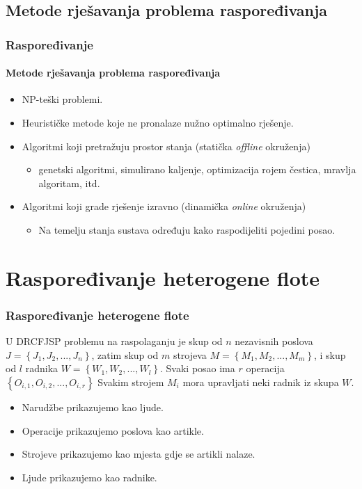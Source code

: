 \documentclass{beamer}
\begin{document}
\subsection{Metode rješavanja problema raspoređivanja}
\begin{frame}
\frametitle{Raspoređivanje}
\framesubtitle{Metode rješavanja problema raspoređivanja}
\begin{itemize}
    \item NP-teški problemi.
    \item Heurističke metode koje ne pronalaze nužno optimalno rješenje.
    \item Algoritmi koji pretražuju prostor stanja (statička \textit{offline} okruženja)
    \begin{itemize}
        \item genetski algoritmi, simulirano kaljenje, optimizacija rojem čestica, mravlja algoritam, itd.
    \end{itemize}
    \item Algoritmi koji grade rješenje izravno (dinamička \textit{online} okruženja)
    \begin{itemize}
        \item Na temelju stanja sustava određuju kako raspodijeliti pojedini posao.
    \end{itemize}
\end{itemize}
\end{frame}

\section{Raspoređivanje heterogene flote}
\begin{frame}
\frametitle{Raspoređivanje heterogene flote}
U DRCFJSP problemu na raspolaganju je skup od $n$ nezavisnih poslova $J = \left\{J_1, J_2, ..., J_n\right\}$,
zatim skup od $m$ strojeva $M = \left\{M_1, M_2, ..., M_m\right\}$, i skup od $l$ radnika $W = \left\{W_1, W_2, ..., W_l\right\}$.
Svaki posao ima $r$ operacija $\left\{O_{i,1}, O_{i,2}, ..., O_{i,r}\right\}$ Svakim strojem $M_i$
mora upravljati neki radnik iz skupa $W$.

\begin{itemize}
    \item Narudžbe prikazujemo kao ljude.
    \item Operacije prikazujemo poslova kao artikle.
    \item Strojeve prikazujemo kao mjesta gdje se artikli nalaze.
    \item Ljude prikazujemo kao radnike.
\end{itemize}

\end{frame}
\end{document}
